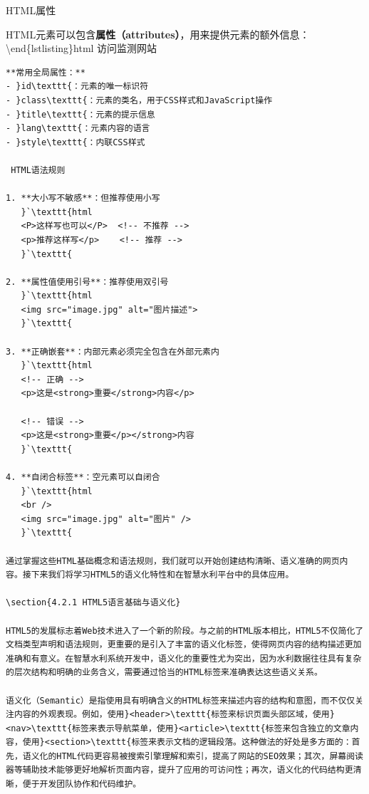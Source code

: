  HTML属性

HTML元素可以包含\textbf{属性（attributes）}，用来提供元素的额外信息： \textbackslash end\{lstlisting\}html 访问监测网站

\begin{lstlisting}
**常用全局属性：**
- }id\texttt{：元素的唯一标识符
- }class\texttt{：元素的类名，用于CSS样式和JavaScript操作
- }title\texttt{：元素的提示信息
- }lang\texttt{：元素内容的语言
- }style\texttt{：内联CSS样式

 HTML语法规则

1. **大小写不敏感**：但推荐使用小写
   }`\texttt{html
   <P>这样写也可以</P>  <!-- 不推荐 -->
   <p>推荐这样写</p>    <!-- 推荐 -->
   }`\texttt{

2. **属性值使用引号**：推荐使用双引号
   }`\texttt{html
   <img src="image.jpg" alt="图片描述">
   }`\texttt{

3. **正确嵌套**：内部元素必须完全包含在外部元素内
   }`\texttt{html
   <!-- 正确 -->
   <p>这是<strong>重要</strong>内容</p>
   
   <!-- 错误 -->
   <p>这是<strong>重要</p></strong>内容
   }`\texttt{

4. **自闭合标签**：空元素可以自闭合
   }`\texttt{html
   <br />
   <img src="image.jpg" alt="图片" />
   }`\texttt{

通过掌握这些HTML基础概念和语法规则，我们就可以开始创建结构清晰、语义准确的网页内容。接下来我们将学习HTML5的语义化特性和在智慧水利平台中的具体应用。

\section{4.2.1 HTML5语言基础与语义化}

HTML5的发展标志着Web技术进入了一个新的阶段。与之前的HTML版本相比，HTML5不仅简化了文档类型声明和语法规则，更重要的是引入了丰富的语义化标签，使得网页内容的结构描述更加准确和有意义。在智慧水利系统开发中，语义化的重要性尤为突出，因为水利数据往往具有复杂的层次结构和明确的业务含义，需要通过恰当的HTML标签来准确表达这些语义关系。

语义化（Semantic）是指使用具有明确含义的HTML标签来描述内容的结构和意图，而不仅仅关注内容的外观表现。例如，使用}<header>\texttt{标签来标识页面头部区域，使用}<nav>\texttt{标签来表示导航菜单，使用}<article>\texttt{标签来包含独立的文章内容，使用}<section>\texttt{标签来表示文档的逻辑段落。这种做法的好处是多方面的：首先，语义化的HTML代码更容易被搜索引擎理解和索引，提高了网站的SEO效果；其次，屏幕阅读器等辅助技术能够更好地解析页面内容，提升了应用的可访问性；再次，语义化的代码结构更清晰，便于开发团队协作和代码维护。


\end{lstlisting}
